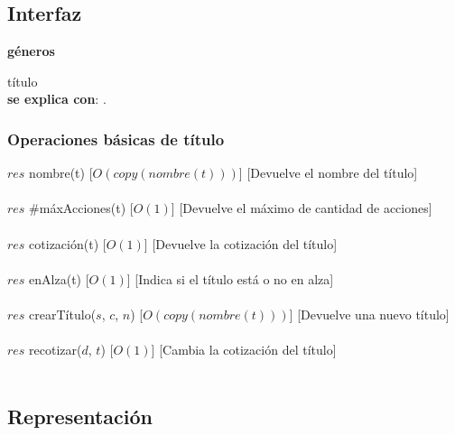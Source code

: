 \subsection{Interfaz}


   \parbox{1.7cm}{\textbf{g\'eneros}} t\'itulo\\
    
  \textbf{se explica con}: .


  \subsubsection{Operaciones b\'asicas de t\'itulo}

  {$res$ \igobs nombre(t)}
  [$O(copy(nombre(t)))$]
  [Devuelve el nombre del t\'itulo]\\\\

  {$res$ \igobs $\#$m\'axAcciones(t)}
  [$O(1)$]
  [Devuelve el m\'aximo de cantidad de acciones]\\\\

  {$res$ \igobs cotizaci\'on(t)}
  [$O(1)$]
  [Devuelve la cotizaci\'on del t\'itulo]\\\\

  {$res$ \igobs enAlza(t)}
  [$O(1)$]
  [Indica si el t\'itulo est\'a o no en alza]\\\\

  {$res$ \igobs crearT\'itulo($s$, $c$, $n$)}
  [$O(copy(nombre(t)))$]
  [Devuelve una nuevo t\'itulo]\\\\

  {$res$ \igobs recotizar($d$, $t$)}
  [$O(1)$]
  [Cambia la cotizaci\'on del t\'itulo]\\\\


\subsection{Representaci\'on}

